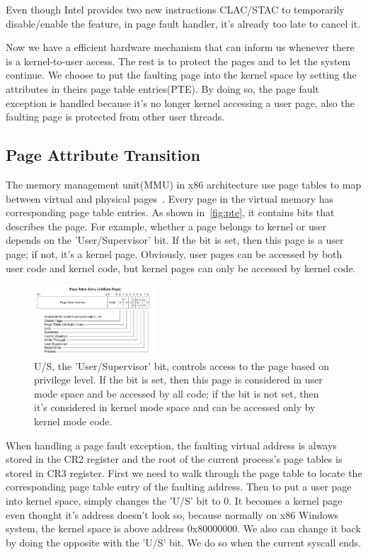 Even though Intel provides two new instructions CLAC/STAC to temporarily disable/enable the feature, in page fault handler, it's already too late to cancel it.

Now we have a efficient hardware mechanism that can inform us whenever there is a kernel-to-user access. The rest is to protect the pages and to let the system continue. We choose to put the faulting page into the kernel space by setting the attributes in theirs page table entries(PTE). By doing so, the page fault exception is handled because it's no longer kernel accessing a user page, also the faulting page is protected from other user threads. 

\subsection{Page Attribute Transition} %


The memory management unit(MMU) in x86 architecture use page tables to map between virtual and physical pages~\cite{intelpaging}. Every page in the virtual memory has corresponding page table entries. As shown in~\autoref{fig:pte}, it contains bits that describes the page. For example, whether a page belongs to kernel or user depends on the 'User/Supervisor' bit. If the bit is set, then this page is a user page; if not, it's a kernel page. Obviously, user pages can be accessed by both user code and kernel code, but kernel pages can only be accessed by kernel code. 

\begin{figure}[th]
  \includegraphics[width=0.40\textwidth]{figures/pte}
  \centering
  \caption{U/S, the 'User/Supervisor' bit, controls access to the page based on privilege level. If the bit is set, then this page is considered in user mode space and be accessed by all code; if the bit is not set, then it's considered in kernel mode space and can be accessed only by kernel mode code. }
  \label{fig:pte}
\end{figure}


When handling a page fault exception, the faulting virtual address is always stored in the CR2 register and the root of the current process's page tables is stored in CR3 register. First we need to walk through the page table to locate the corresponding page table entry of the faulting address. Then to put a user page into kernel space, simply changes the 'U/S' bit to 0. It becomes a kernel page even thought it's address doesn't look so, because normally on x86 Windows system, the kernel space is above address 0x80000000. We also can change it back by doing the opposite with the 'U/S' bit. We do so when the current syscall ends.

